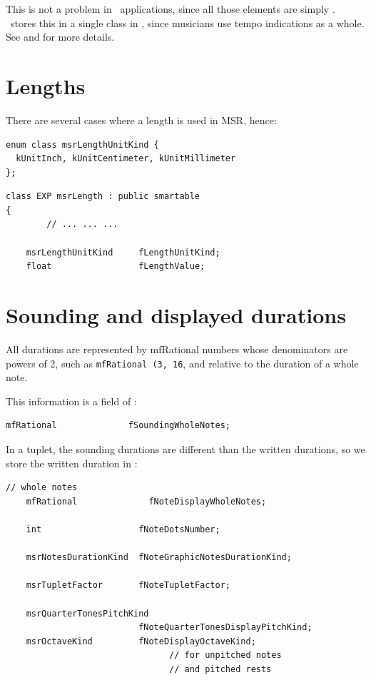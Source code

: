 This is not a problem in \GUI\ applications, since all those elements are simply \drawn. \msrRepr\ stores this in a single  class   in , since musicians use tempo indications as a whole.
See  and  for more details.


\section{Lengths}\label{Lengths}

There are several cases where a length is used in MSR, hence:
\begin{lstlisting}[language=CPlusPlus]
enum class msrLengthUnitKind {
  kUnitInch, kUnitCentimeter, kUnitMillimeter
};
\end{lstlisting}

\begin{lstlisting}[language=CPlusPlus]
class EXP msrLength : public smartable
{
		// ... ... ...

    msrLengthUnitKind     fLengthUnitKind;
    float                 fLengthValue;
\end{lstlisting}


\section{Sounding and displayed durations}\label{Sounding and displayed durations}

All durations are represented by mfRational numbers whose denominators are powers of 2, such as {\tt mfRational (3, 16}, and relative to the duration of a whole note.

This information is a field of :
\begin{lstlisting}[language=CPlusPlus]
    mfRational              fSoundingWholeNotes;
\end{lstlisting}

In a tuplet, the sounding durations are different than the written durations, so we store the written duration in :

\begin{lstlisting}[language=CPlusPlus]
    // whole notes
    mfRational              fNoteDisplayWholeNotes;

    int                   fNoteDotsNumber;

    msrNotesDurationKind  fNoteGraphicNotesDurationKind;

    msrTupletFactor       fNoteTupletFactor;

    msrQuarterTonesPitchKind
                          fNoteQuarterTonesDisplayPitchKind;
    msrOctaveKind         fNoteDisplayOctaveKind;
                                // for unpitched notes
                                // and pitched rests
\end{lstlisting}

